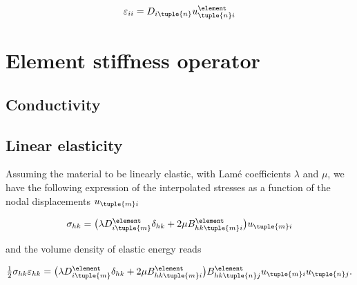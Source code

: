\documentclass[oneside]{memoir}
\begin{document}
\begin{equation*}
\begin{split}\varepsilon_{ii}=D_{i\tuple{n}}u_{\tuple{n}i}^\element\end{split}\end{equation*}


\hypertarget{15811403169534872275}{}


\section{Element stiffness operator}



\hypertarget{6549129120501784746}{}


\subsection{Conductivity}



\hypertarget{5017937499254797989}{}


\subsection{Linear elasticity}



Assuming the material to be linearly elastic, with Lamé coefficients \(\lambda\) and \(\mu\), we have the following expression of the interpolated stresses as a function of the nodal displacements \(u_{\tuple{m}i}\)



\begin{equation*}
\begin{split}\sigma_{hk}=\bigl(\lambda D^\element_{i\tuple{m}}\delta_{hk}
+2\mu B^\element_{hk\tuple{m}i}\bigr)u_{\tuple{m}i}\end{split}\end{equation*}


and the volume density of elastic energy reads



\begin{equation*}
\begin{split}\tfrac12\sigma_{hk}\varepsilon_{hk}
=\bigl(\lambda D^\element_{i\tuple{m}}\delta_{hk}
+2\mu B^\element_{hk\tuple{m}i}\bigr)B_{hk\tuple{n}j}^\element
u_{\tuple{m}i}u_{\tuple{n}j}.\end{split}\end{equation*}
\end{document}
